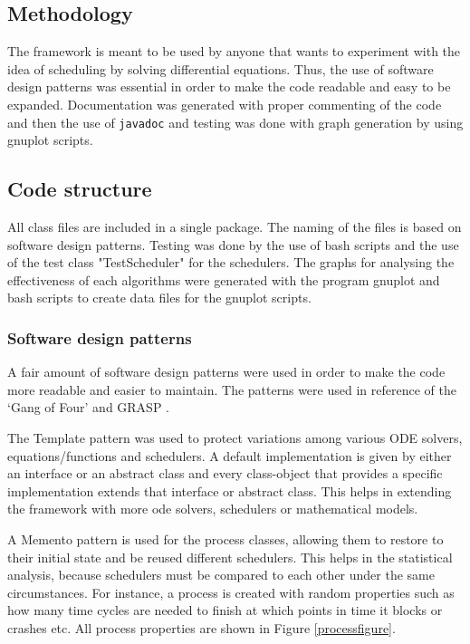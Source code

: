 \subsection{Methodology}
The framework is meant to be used by anyone that wants to experiment with the idea of scheduling by solving differential equations. Thus, the use of software design patterns was essential in order to make the code readable and easy to be expanded. Documentation was generated with proper commenting of the code and then the use of \texttt{javadoc} \cite{javadoc} and testing was done with graph generation by using gnuplot scripts.

\subsection{Code structure}
All class files are included in a single package. The naming of the files is based on software design patterns. Testing was done by the use of bash scripts and the use of the test class "TestScheduler" for the schedulers. The graphs for analysing the effectiveness of each algorithms were generated with the program gnuplot and bash scripts to create data files for the gnuplot scripts.  

\subsubsection{Software design patterns}
A fair amount of software design patterns were used in order to make the code more readable and easier to maintain. %
The patterns were used in reference of the `Gang of Four' \cite{gamma_design_1998} and GRASP \cite{larman_applying_2004}.

The Template pattern was used to protect variations among various ODE solvers, equations/functions and schedulers. A default implementation is given by either an interface or an abstract class and every class-object that provides a specific implementation extends that interface or abstract class. This helps in extending the framework with more ode solvers, schedulers or mathematical models.

A Memento pattern is used for the process classes, allowing them to restore to their initial state and be reused different schedulers. This helps in the statistical analysis, because schedulers must be compared to each other under the same circumstances. For instance, a process is created with random properties such as how many time cycles are needed to finish at which points in time it blocks or crashes etc. All process properties are shown in Figure \ref{processfigure}.

